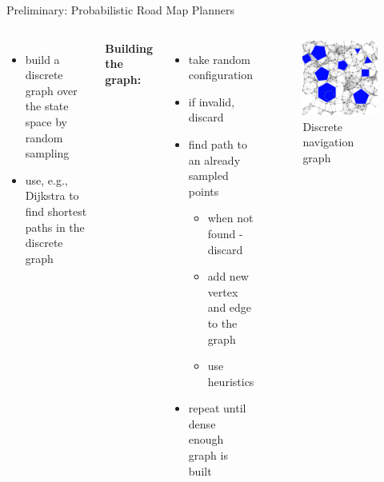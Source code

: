 \documentclass[ignorenonframetext,aspectratio=169,]{paradise-slide}
\providecommand{\tightlist}{%
  \setlength{\itemsep}{0pt}\setlength{\parskip}{0pt}}
\begin{document}
\begin{frame}[fragile]{Preliminary: Probabilistic Road Map Planners}
\protect\hypertarget{preliminary-probabilistic-road-map-planners}{}

\begin{columns}


\begin{itemize}
\tightlist
\item
  build a discrete graph over the state space by random sampling
\item
  use, e.g., Dijkstra to find shortest paths in the discrete graph
\end{itemize}

\textbf{Building the graph:}

\begin{itemize}
\tightlist
\item
  take random configuration
\item
  if invalid, discard
\item
  find path to an already sampled points

  \begin{itemize}
  \tightlist
  \item
    when not found - discard
  \item
    add new vertex and edge to the graph
  \item
    use heuristics
  \end{itemize}
\item
  repeat until dense enough graph is built
\end{itemize}


\begin{figure}
\centering
\includegraphics{PRM-23.png}
\caption{Discrete navigation graph}
\end{figure}

\end{columns}

\end{frame}
\end{document}
